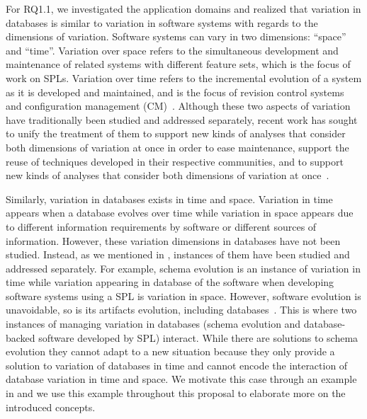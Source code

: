 For RQ1.1,
we investigated the application domains and realized that variation
in databases is similar to variation in software systems with regards
to the dimensions of variation.
%
Software systems can vary in two dimensions: ``space'' and ``time''.
Variation over space refers to the simultaneous development and maintenance of
related systems with different feature sets, which is the focus of work on
SPLs.
%
Variation over time refers to the incremental evolution of a system as it is
developed and maintained, and is the focus of revision control systems and
configuration management (CM)~\cite{Dart91}.
%
Although these two aspects of variation have traditionally been studied and
addressed separately, recent work has sought to unify the treatment of them
to support new kinds
of analyses that consider both dimensions of variation at once
in order to ease maintenance, support the reuse of
techniques developed in their respective communities, and to support new kinds
of analyses that consider both dimensions of variation at once~\cite{Thu19vv}.
%



Similarly, variation in databases exists in time and space. 
Variation in time  appears when a database evolves 
over time while variation in space  appears due
to different information requirements by software or different
sources of information. 
%
However, these variation dimensions in databases have not
been studied. Instead, as we mentioned in ,
instances of them have been studied and addressed separately. 
%
For example, schema evolution is an instance of variation in
time while variation appearing in database of the software 
when developing software systems using a SPL is variation in 
space.
%
However, software evolution is unavoidable, so is its artifacts evolution, 
including databases~\cite{dbSPLevolve}.
This is where two instances of managing 
variation in databases (schema evolution and database-backed software 
developed by SPL) interact.
While there are solutions to schema evolution
they cannot adapt to a new situation because they only provide a solution to
variation of databases in time and cannot encode the interaction of database variation in
time and space.
We motivate this case through an example in  and we use this
example throughout this proposal to elaborate more on the introduced 
concepts. 

